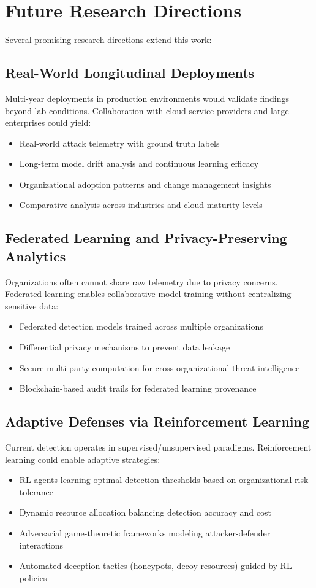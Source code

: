 \section{Future Research Directions}\label{sec:conclusion-future}
Several promising research directions extend this work:

\subsection{Real-World Longitudinal Deployments}
Multi-year deployments in production environments would validate findings beyond lab conditions. Collaboration with cloud service providers and large enterprises could yield:
\begin{itemize}
    \item Real-world attack telemetry with ground truth labels
    \item Long-term model drift analysis and continuous learning efficacy
    \item Organizational adoption patterns and change management insights
    \item Comparative analysis across industries and cloud maturity levels
\end{itemize}

\subsection{Federated Learning and Privacy-Preserving Analytics}
Organizations often cannot share raw telemetry due to privacy concerns. Federated learning enables collaborative model training without centralizing sensitive data:
\begin{itemize}
    \item Federated detection models trained across multiple organizations
    \item Differential privacy mechanisms to prevent data leakage
    \item Secure multi-party computation for cross-organizational threat intelligence
    \item Blockchain-based audit trails for federated learning provenance
\end{itemize}

\subsection{Adaptive Defenses via Reinforcement Learning}
Current detection operates in supervised/unsupervised paradigms. Reinforcement learning could enable adaptive strategies:
\begin{itemize}
    \item RL agents learning optimal detection thresholds based on organizational risk tolerance
    \item Dynamic resource allocation balancing detection accuracy and cost
    \item Adversarial game-theoretic frameworks modeling attacker-defender interactions
    \item Automated deception tactics (honeypots, decoy resources) guided by RL policies
\end{itemize}

